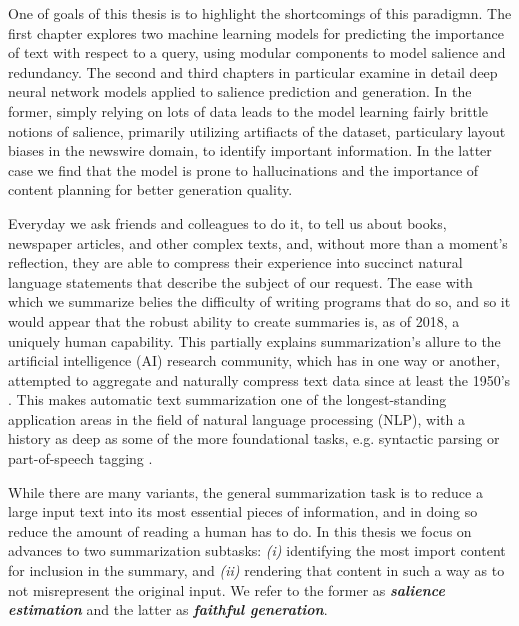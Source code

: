 One of goals of this thesis is to highlight the shortcomings of this paradigmn.
The first chapter explores two machine learning models for predicting
the importance of text with respect to a query, using modular components
to model salience and redundancy.
The second and third chapters in particular examine in detail deep neural
network models applied to salience prediction and generation.
In the former, simply relying on lots of data leads to the model 
learning fairly brittle notions of salience, primarily utilizing artifiacts
of the dataset, particulary layout biases in the newswire domain, to
identify important information. In the latter case we find that the 
model is prone to hallucinations and the importance of content 
planning for better generation quality.











Everyday we ask friends and colleagues to do it, to tell us about books, 
newspaper articles, and other complex texts, and, without more than a 
moment's reflection, they are able to compress their experience
into succinct natural language statements that describe the
subject of our request.
The ease with which we summarize belies the difficulty of
writing programs that do so, and so it would appear that 
the robust
ability to create summaries is, as of 2018, a uniquely human capability.
This partially explains summarization's allure to the artificial intelligence (AI)
research community, which has in one way or another, attempted to aggregate
and naturally compress text data since at least the 1950's 
\cite{luhn1958automatic}.
This makes automatic text summarization one of the longest-standing 
application areas in the 
field of natural language processing (NLP), with a history as deep 
as some of the more foundational tasks, e.g. syntactic parsing 
\cite{yngve1955syntax} or 
part-of-speech tagging \cite{harris1962string}. 

While there are many variants, 
the general summarization task is 
to reduce a large input text into its most essential pieces of information,
and in doing so reduce the amount of reading a human has to do. 
In this thesis we focus on advances to two summarization subtasks:
\textit{(i)} identifying the most import content for inclusion in the summary, 
and \textit{(ii)}
rendering that content in such a way as to not misrepresent the original 
input. We refer to the former as \textbf{\textit{salience estimation}} and the latter
as \textbf{\textit{faithful generation}}. 

